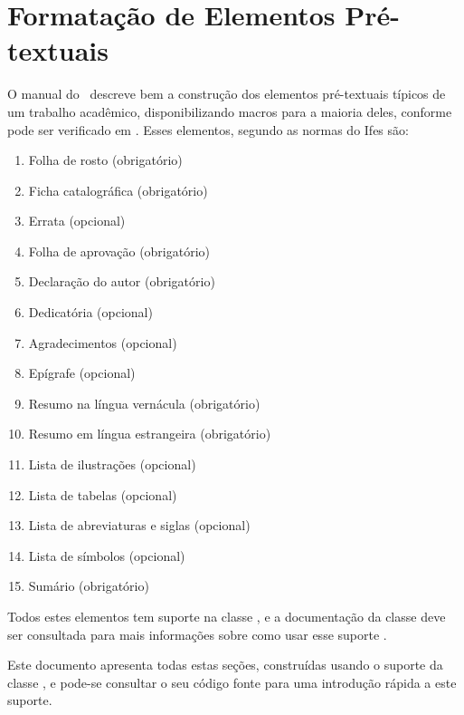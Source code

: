 \documentclass[12pt,times,a4paper,english,brazil,
chapter=TITLE,section=TITLE,subsection=TITLE]{ifes7}
\begin{document}
\Blindtext

\blinditemize[7]

\blindtext[2]

\blindenumerate[5]

\blindtext



\chapter{Formatação de Elementos Pré-textuais}
\label{cha:format-pre-text}

O manual do \abnTeX\ descreve bem a construção dos elementos
pré-textuais típicos de um trabalho acadêmico, disponibilizando macros
para a maioria deles, conforme pode ser verificado em
\cite[cap.~6]{Araujo2016}. Esses elementos, segundo as normas do Ifes
são:

\begin{enumerate}
\item Folha de rosto (obrigatório)
\item Ficha catalográfica (obrigatório)
\item Errata (opcional)
\item Folha de aprovação (obrigatório)
\item Declaração do autor (obrigatório)
\item Dedicatória (opcional)
\item Agradecimentos (opcional)
\item Epígrafe (opcional)
\item Resumo na língua vernácula (obrigatório)
\item Resumo em língua estrangeira (obrigatório)
\item Lista de ilustrações (opcional)
\item Lista de tabelas (opcional)
\item Lista de abreviaturas e siglas (opcional)
\item Lista de símbolos (opcional)
\item Sumário (obrigatório)
\end{enumerate}

Todos estes elementos tem suporte na classe \abnTeX, e a documentação
da classe deve ser consultada para mais informações sobre como usar
esse suporte \cite{Araujo2016}.

Este documento apresenta todas estas seções, construídas usando o
suporte da classe \abnTeX, e pode-se consultar o seu código fonte para
uma introdução rápida a este suporte.
\end{document}
